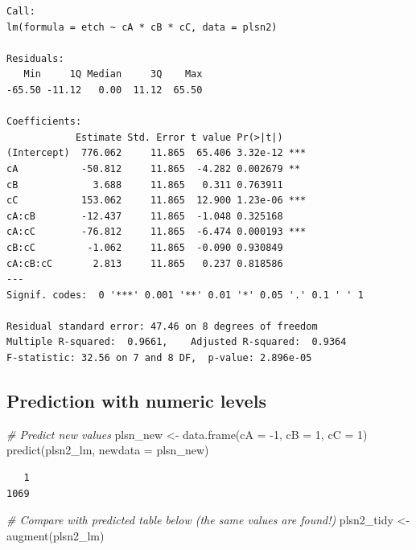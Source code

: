 \documentclass[
]{book}
\newenvironment{Shaded}{\begin{snugshade}}{\end{snugshade}}
\newcommand{\AttributeTok}[1]{\textcolor[rgb]{0.77,0.63,0.00}{#1}}
\newcommand{\CommentTok}[1]{\textcolor[rgb]{0.56,0.35,0.01}{\textit{#1}}}
\newcommand{\DecValTok}[1]{\textcolor[rgb]{0.00,0.00,0.81}{#1}}
\newcommand{\FunctionTok}[1]{\textcolor[rgb]{0.00,0.00,0.00}{#1}}
\newcommand{\NormalTok}[1]{#1}
\newcommand{\OtherTok}[1]{\textcolor[rgb]{0.56,0.35,0.01}{#1}}
\newcommand{\SpecialCharTok}[1]{\textcolor[rgb]{0.00,0.00,0.00}{#1}}
\begin{document}
\begin{verbatim}
Call:
lm(formula = etch ~ cA * cB * cC, data = plsn2)

Residuals:
   Min     1Q Median     3Q    Max 
-65.50 -11.12   0.00  11.12  65.50 

Coefficients:
            Estimate Std. Error t value Pr(>|t|)    
(Intercept)  776.062     11.865  65.406 3.32e-12 ***
cA           -50.812     11.865  -4.282 0.002679 ** 
cB             3.688     11.865   0.311 0.763911    
cC           153.062     11.865  12.900 1.23e-06 ***
cA:cB        -12.437     11.865  -1.048 0.325168    
cA:cC        -76.812     11.865  -6.474 0.000193 ***
cB:cC         -1.062     11.865  -0.090 0.930849    
cA:cB:cC       2.813     11.865   0.237 0.818586    
---
Signif. codes:  0 '***' 0.001 '**' 0.01 '*' 0.05 '.' 0.1 ' ' 1

Residual standard error: 47.46 on 8 degrees of freedom
Multiple R-squared:  0.9661,	Adjusted R-squared:  0.9364 
F-statistic: 32.56 on 7 and 8 DF,  p-value: 2.896e-05
\end{verbatim}

\hypertarget{prediction-with-numeric-levels}{%
\subsection{Prediction with numeric levels}\label{prediction-with-numeric-levels}}

\begin{Shaded}
\begin{Highlighting}[]
\CommentTok{\# Predict new values}
\NormalTok{plsn\_new }\OtherTok{\textless{}{-}} \FunctionTok{data.frame}\NormalTok{(}\AttributeTok{cA =} \SpecialCharTok{{-}}\DecValTok{1}\NormalTok{, }\AttributeTok{cB =} \DecValTok{1}\NormalTok{, }\AttributeTok{cC =} \DecValTok{1}\NormalTok{)}
\FunctionTok{predict}\NormalTok{(plsn2\_lm, }\AttributeTok{newdata =}\NormalTok{ plsn\_new)}
\end{Highlighting}
\end{Shaded}

\begin{verbatim}
   1 
1069 
\end{verbatim}

\begin{Shaded}
\begin{Highlighting}[]
\CommentTok{\# Compare with predicted table below (the same values are found!)}
\NormalTok{plsn2\_tidy }\OtherTok{\textless{}{-}} \FunctionTok{augment}\NormalTok{(plsn2\_lm)}
\end{Highlighting}
\end{Shaded}
\end{document}
